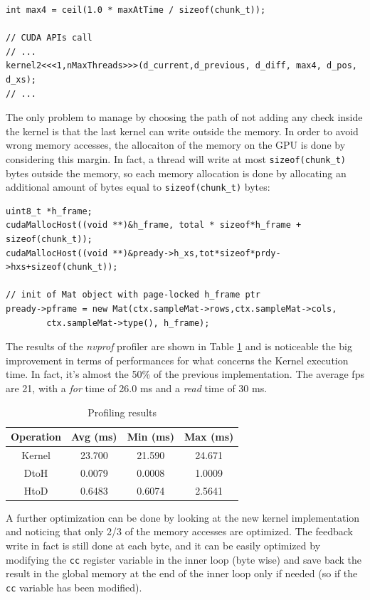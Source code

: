 \documentclass[paper=a4, fontsize=10pt]{scrartcl}	%
\begin{document}
	\begin{lstlisting}[style=CStyle]
int max4 = ceil(1.0 * maxAtTime / sizeof(chunk_t));

// CUDA APIs call
// ...
kernel2<<<1,nMaxThreads>>>(d_current,d_previous, d_diff, max4, d_pos, d_xs);
// ...
\end{lstlisting}

	The only problem to manage by choosing the path of not adding any check inside the kernel is that the last kernel can write outside the memory. In order to avoid wrong memory accesses, the allocaiton of the memory on the GPU is done by considering this margin. In fact, a thread will write at most \texttt{sizeof(chunk\_t)} bytes outside the memory, so each memory allocation is done by allocating an additional amount of bytes equal to \texttt{sizeof(chunk\_t)} bytes:

	\begin{lstlisting}[style=CStyle]
uint8_t *h_frame;
cudaMallocHost((void **)&h_frame, total * sizeof*h_frame + sizeof(chunk_t));
cudaMallocHost((void **)&pready->h_xs,tot*sizeof*prdy->hxs+sizeof(chunk_t));

// init of Mat object with page-locked h_frame ptr
pready->pframe = new Mat(ctx.sampleMat->rows,ctx.sampleMat->cols,
		ctx.sampleMat->type(), h_frame); 
	\end{lstlisting}

	The results of the \textit{nvprof} profiler are shown in Table \ref{tab:nvprof_naif4} and is noticeable the big improvement in terms of performances for what concerns the Kernel execution time. In fact, it's almost the 50\% of the previous implementation. The average fps are 21, with a \textit{for} time of 26.0 ms and a \textit{read} time of 30 ms.

	\begin{table}[H]
		\centering
		\begin{tabular}{||c | c c c||} 
			\hline
			Operation & Avg (ms) & Min (ms) & Max (ms) \\ [0.5ex] 
			\hline\hline
			Kernel & 23.700 & 21.590 & 24.671 \\ 
			\hdashline
			DtoH & 0.0079 & 0.0008 & 1.0009 \\
			\hdashline
			HtoD & 0.6483 & 0.6074 & 2.5641 \\
			\hline
		\end{tabular}
		\caption{Profiling results}
		\label{tab:nvprof_naif4}
	\end{table}

	A further optimization can be done by looking at the new kernel implementation and noticing that only 2/3 of the memory accesses are optimized. The feedback write in fact is still done at each byte, and it can be easily optimized by modifying the \texttt{cc} register variable in the inner loop (byte wise) and save back the result in the global memory at the end of the inner loop only if needed (so if the \texttt{cc} variable has been modified).\\
	
\end{document}
